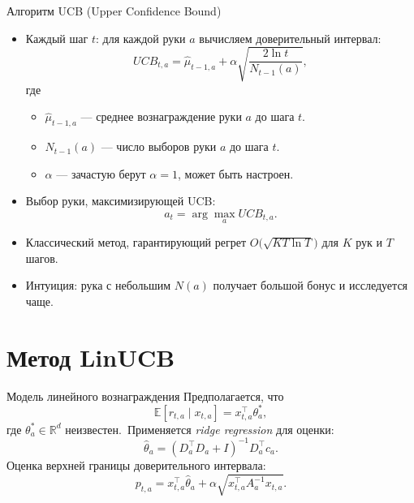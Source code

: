 \documentclass[10pt]{beamer}
\begin{document}
\begin{frame}{Алгоритм UCB (Upper Confidence Bound)}
  \begin{itemize}
    \item Каждый шаг $t$: для каждой руки $a$ вычисляем доверительный интервал:
    $$UCB_{t,a} = \hat{\mu}_{t-1,a} + \alpha\sqrt{\frac{2\ln t}{N_{t-1}(a)}},$$
    где
    \begin{itemize}
      \item $\hat{\mu}_{t-1,a}$ — среднее вознаграждение руки $a$ до шага $t$.
      \item $N_{t-1}(a)$ — число выборов руки $a$ до шага $t$.
      \item $\alpha$ — зачастую берут $\alpha=1$, \!может быть настроен.
    \end{itemize}
    \item Выбор руки, максимизирующей UCB:
    $$a_t = \arg\max_a UCB_{t,a}.$$  
    \item Классический метод, гарантирующий регрет $O\bigl(\sqrt{KT\ln T}\bigr)$ для $K$ рук и $T$ шагов.
    \item Интуиция: рука с небольшим $N(a)$ получает большой бонус и исследуется чаще.
  \end{itemize}
\end{frame}
\section{Метод LinUCB}
\begin{frame}{Модель линейного вознаграждения}
  Предполагается, что
  \[
    \mathbb{E}[r_{t,a}\mid x_{t,a}]=x_{t,a}^\top \theta^*_a,
  \]
  где $\theta^*_a\in\mathbb{R}^d$ неизвестен.\
  Применяется \emph{ridge regression} для оценки:
  \[
    \hat{\theta}_a=(D_a^\top D_a + I)^{-1} D_a^\top c_a.
  \]
  Оценка верхней границы доверительного интервала:
  \[
    p_{t,a}=x_{t,a}^\top \hat{\theta}_a + \alpha\sqrt{x_{t,a}^\top A_a^{-1} x_{t,a}}.
  \]
\end{frame}
\end{document}
